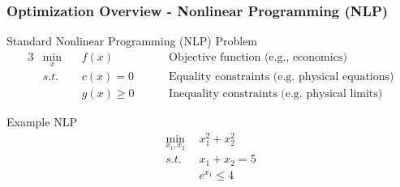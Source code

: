 \begin{frame}
    \frametitle{Optimization Overview - Nonlinear Programming (NLP)}
    \begin{block}{Standard Nonlinear Programming (NLP) Problem}
    \begin{alignat*}{3}
        &\min_x &&f(x)  &&\quad\text{Objective function (e.g., economics)}\\
        &s.t.\ \ &&c(x) = 0\ \  &&\quad\text{Equality constraints (e.g. physical equations)} \\
        & &&g(x) \ge 0 \ \ &&\quad\text{Inequality constraints (e.g. physical limits)}
    \end{alignat*}
    \end{block}

    \begin{exampleblock}{Example NLP}
        \vspace{-0.5cm}
        \begin{align*}
            \min_{x_1,x_2} \ \ &x_1^2 + x_2^2\\
            s.t. \ \ &x_1 + x_2 = 5\\
            &e^{x_1} \le 4\\
        \end{align*}
        \vspace{-1.2cm}
    \end{exampleblock}
\end{frame}


